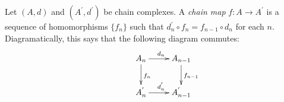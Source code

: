 \documentclass{article}
\begin{document}
Let $(A,d)$ and $(A^{'},d^{'})$ be chain complexes. A \emph{chain map} $f:A \to A^{'}$ is a sequence of homomorphisms $\{f_n\}$ such that $d_{n}^{'} \circ f_{n} =  f_{n-1} \circ d_{n}$ for each $n$. Diagramatically, this says that the following diagram commutes: 
$$
\xymatrix{
& A_{n} \ar[d]^{f_n} \ar[r]^{d_{n}} & A_{n-1} \ar[d]^{f_{n-1}} \\
& A_{n}^{'} \ar[r]^{d_{n}^{'}} & A_{n-1}^{'}
}
$$
\end{document}
